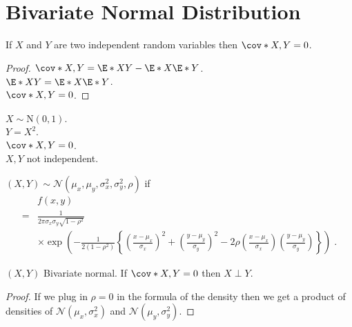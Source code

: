 \newpage


\section{Bivariate Normal Distribution}

\begin{proposition} 
If $X$ and $Y$ are two independent random variables
then $\cov*{X,Y}=0$.
\end{proposition}

\begin{proof}
$\cov*{X,Y} = \E*{XY}-\E*{X}\E*{Y}$.\\
$\E*{XY} = \E*{X}\E*{Y}$.\\
$\cov*{X,Y} = 0$.
\end{proof}

\begin{example}[$\cov*{X,Y}=0$ does not imply independence.]
$X\sim\mathrm{N}(0,1)$.\\
$Y=X^2$.\\
$\cov*{X,Y}=0$.\\
$X,Y$ not independent.
\end{example}

\begin{definition}
$(X,Y)\sim\mathcal{N}(\mu_x,\mu_y,\sigma_x^2,\sigma_y^2,\rho)$ if
\begin{align*}
& f(x,y) \\
={} & \frac{1}{2\pi\sigma_x\sigma_y\sqrt{1-\rho^2}}\\
& \times \exp\left(-\frac{1}{2(1-\rho^2)}
\left\{ 
\left(\frac{x-\mu_x}{\sigma_x}\right)^2
+\left(\frac{y-\mu_y}{\sigma_y}\right)^2
-2\rho\left(\frac{x-\mu_x}{\sigma_x}\right)
\left(\frac{y-\mu_y}{\sigma_y}\right)
\right\}
\right)\;.
\end{align*}
\end{definition}

\begin{proposition}
$(X,Y)$ Bivariate normal. If $\cov*{X,Y}=0$ then $X\perp Y$.    
\end{proposition}

\begin{proof}
If we plug in $\rho=0$ in the formula of the density then we get a product of densities of $\mathcal{N}(\mu_x,\sigma_x^2)$ and $\mathcal{N}(\mu_y,\sigma_y^2)$.
\end{proof}

